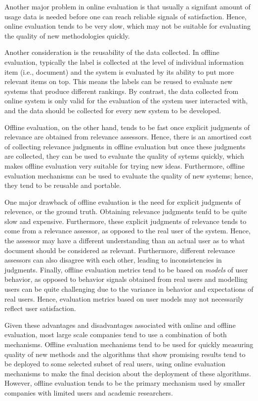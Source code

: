 \documentclass[openany]{now} %
\begin{document}
Another major problem in online evaluation is that usually a signifant amount of usage data is needed before one can reach reliable signals of satisfaction. Hence, online evaluation tends to be very slow, which may not be suitable for evaluating the quality of new methodologies quickly. 

Another consideration is the reusability of the data collected. In offline evaluation, typically the label is collected at the level of individual information item (i.e., document) and the system is evaluated by its ability to put more relevant items on top. This means the labels can be reused to evaluate new systems that produce different rankings. By contrast, the data collected from online system is only valid for the evaluation of the system user interacted with, and the data should be collected for every new system to be developed.

Offline evaluation, on the other hand, tends to be fast once explicit judgments of relevance are obtained from relevance assessors. Hence, there is an amortised cost of collecting relevance judgments in offline evaluation but once these judgments are collected, they can be used to evaluate the quality of sytems quickly, which makes offline evaluation very suitable for trying new ideas. Furthermore, offline evaluation mechanisms can be used to evaluate the quality of new systems; hence, they tend to be reusable and portable. 

One major drawback of offline evaluation is the need for explicit judgments of relevence, or the ground truth. Obtaining relevance judgments tenfd to be quite slow and expensive. Furthermore, these explicit judgments of relevance tends to come from a relevance assessor, as opposed to the real user of the system. Hence, the assessor may have a different understanding than an actual user as to what document should be considered as relevant. Furthermore, different relevance assessors can also disagree with each other, leading to inconsistencies in judgments. Finally, offline evaluation metrics tend to be based on \emph{models} of user behavior, as opposed to behavior signals obtained from real users and modelling users can be quite challenging due to the variance in behavior and expectations of real users. Hence, evaluation metrics based on user models may not necessarily reflect user satisfaction.

Given these advantages and disadvantages associated with online and offline evaluation, most large scale companies tend to use a combination of both mechanisms. Offline evaluation mechanisms tend to be used for quickly measuring quality of new methods and the algorithms that show promising results tend to be deployed to some selected subset of real users, using online evaluation mechanisms to make the final decision about the deployment of these algorithms. However, offline evaluation tends to be the primary mechanism used by smaller companies with limited users and academic researchers. 
\end{document}

